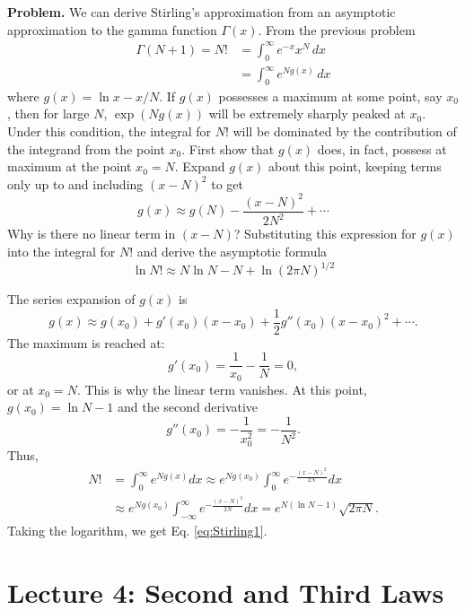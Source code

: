 \documentclass[twocolumn, 10pt]{article}
\numberwithin{equation}{section}
\newenvironment{problem}
{\par\medskip \color{problemblue}
  \textbf{Problem. }\ignorespaces}
{\medskip}
\newenvironment{solution}[1][\empty]
{\par\medskip\sffamily
  \textbf{\ifx\empty#1{Solution.}\relax\else{#1}\fi} \ignorespaces}
{\medskip}
\begin{document}
\begin{problem}
We can derive Stirling's approximation from
an asymptotic approximation to the gamma function $\Gamma(x)$.
From the previous problem
\begin{align*}
  \Gamma(N+1) = N!
  &= \int_0^\infty e^{-x} x^N \, dx
  \\
  &= \int_0^\infty e^{N g(x)} \, dx
\end{align*}
where $g(x) = \ln x - x/N$.
%
If $g(x)$ possesses a maximum at some point, say $x_0$,
then for large $N$, $\exp(N g(x))$ will be extremely
sharply peaked at $x_0$.
%
Under this condition, the integral for $N!$
will be dominated by the contribution of the integrand
from the point $x_0$.
%
First show that $g(x)$ does, in fact,
possess at maximum at the point $x_0 = N$.
%
Expand $g(x)$ about this point,
keeping terms only up to and including
$(x-N)^2$ to get
$$
g(x) \approx g(N) - \frac{ (x - N)^2 } { 2 N^2 } + \cdots
$$
Why is there no linear term in $(x-N)$?
Substituting this expression for $g(x)$
into the integral for $N!$ and derive the asymptotic formula
\begin{equation}
  \ln N! \approx N \ln N - N + \ln (2\pi N)^{1/2}
  \label{eq:Stirling1}
\end{equation}
\end{problem}

\begin{solution}
The series expansion of $g(x)$ is
$$
  g(x) \approx g(x_0)
  + g'(x_0) (x - x_0)
  + \frac{1}{2} g''(x_0) (x - x_0)^2
  + \cdots.
$$
The maximum is reached at:
$$
  g'(x_0) = \frac{1}{x_0} - \frac{1}{N} = 0,
$$
or at $x_0 = N$.
This is why the linear term vanishes.
%
At this point, $g(x_0) = \ln N - 1$
and the second derivative
$$
  g''(x_0) = -\frac{1}{x_0^2} = -\frac{1}{N^2}.
$$
%
Thus,
\begin{align*}
  N!
  &= \int_0^\infty e^{Ng(x)} dx
  \approx
  e^{Ng(x_0)}
  \int_0^\infty
  e^{- \frac{(x-N)^2}{2N} } dx
  \\
  &\approx
  e^{Ng(x_0)}
  \int_{-\infty}^\infty
  e^{- \frac{(x-N)^2}{2N} } dx
  =
  e^{N(\ln N - 1)} \sqrt{2\pi N}
  .
\end{align*}
%
Taking the logarithm, we get Eq. \eqref{eq:Stirling1}.
\end{solution}

\section{Lecture 4: Second and Third Laws}
\end{document}
